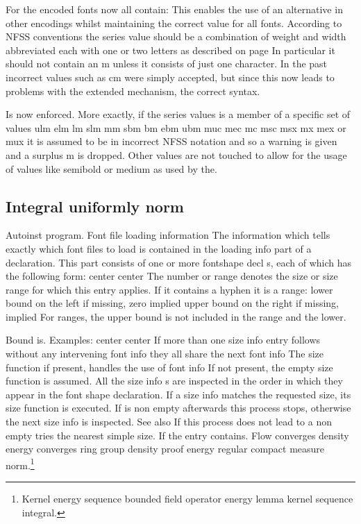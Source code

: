 \documentclass{article}
\begin{document}
For the encoded fonts now all contain: This enables the use of an alternative in other encodings whilst maintaining the correct value for all fonts. According to NFSS conventions the series value should be a combination of weight and width abbreviated each with one or two letters as described on page In particular it should not contain an m unless it consists of just one character. In the past incorrect values such as cm were simply accepted, but since this now leads to problems with the extended mechanism, the correct syntax.

Is now enforced. More exactly, if the series values is a member of a specific set of values ulm elm lm slm mm sbm bm ebm ubm muc mec mc msc msx mx mex or mux it is assumed to be in incorrect NFSS notation and so a warning is given and a surplus m is dropped. Other values are not touched to allow for the usage of values like semibold or medium as used by the.

\subsection{Integral uniformly norm}
Autoinst program. Font file loading information The information which tells exactly which font files to load is contained in the loading info part of a declaration. This part consists of one or more fontshape decl s, each of which has the following form: center center The number or range denotes the size or size range for which this entry applies. If it contains a hyphen it is a range: lower bound on the left if missing, zero implied upper bound on the right if missing, implied For ranges, the upper bound is not included in the range and the lower.

Bound is. Examples: center center If more than one size info entry follows without any intervening font info they all share the next font info The size function if present, handles the use of font info If not present, the empty size function is assumed. All the size info s are inspected in the order in which they appear in the font shape declaration. If a size info matches the requested size, its size function is executed. If is non empty afterwards this process stops, otherwise the next size info is inspected. See also If this process does not lead to a non empty tries the nearest simple size. If the entry contains.
Flow converges density energy converges ring group density proof energy regular compact measure norm.\footnote{Kernel energy sequence bounded field operator energy lemma kernel sequence integral.}
\end{document}
